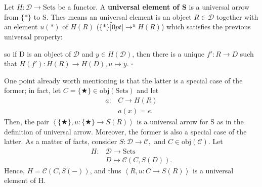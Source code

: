 \documentclass[../category_theory.tex]{subfiles}
\begin{document}
\begin{def*}
	Let \(H:\mathcal{D}\rightarrow \mathrm{Sets}\) be a functor. A \textbf{universal element of S} is a universal arrow from \(\{*\}\) to S. Thes means an universal element is an object \(R\in \mathcal{D}\) together with an element \(u(*)\) of \(H(R)\) (\(\{*\}\overbracket[0pt]{\longrightarrow}^{u } H(R)\)) which satisfies the previous universal property:
	\begin{center}
	\end{center}
	so if D is an object of \(\mathcal{D}\) and \(y\in H(\mathcal{D})\), then there is a unique \(f':R\rightarrow D\) such that \(H(f'):H(R)\rightarrow H(D), u\mapsto y\).
	\(\square\)
\end{def*}

One point already worth mentioning is that the latter is a special case of the former; in fact, let \(C=\{\bigstar\}\in  \mathrm{obj}(\mathrm{Sets})\) and let
\begin{align*}
	a: & C\rightarrow H(R) \\
	   & a(x)=e.
\end{align*}
Then, the pair \(\left< \{\bigstar\}, u:\{\bigstar\}\rightarrow  S(R)\right>\) is a universal arrow for S as in the definition of universal arrow.
Moreover, the former is also a special case of the latter. As a matter of facts, consider \(S:\mathcal{D}\rightarrow \mathcal{C},\) and \(C\in \mathrm{obj}(\mathcal{C})\). Let
\begin{align*}
	H: & \mathcal{D}\rightarrow \mathrm{Sets} \\
	   & D\mapsto \mathcal{C}(C, S(D)).
\end{align*}
Hence, \(H=\mathcal{C}(C, S(-))\), and thus \(\left< R, u:C\rightarrow S(R) \right>\) is a universal element of H.
\end{document}
